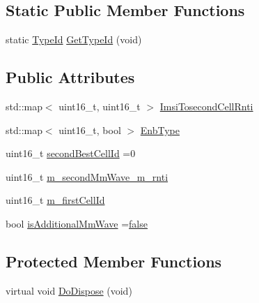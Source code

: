 \subsection*{Static Public Member Functions}
\begin{DoxyCompactItemize}
\item 
static \hyperlink{classns3_1_1TypeId}{Type\+Id} \hyperlink{classns3_1_1LteEnbRrc_a190eb3b4dd8f551a205878eceddac013}{Get\+Type\+Id} (void)
\end{DoxyCompactItemize}
\subsection*{Public Attributes}
\begin{DoxyCompactItemize}
\item 
std\+::map$<$ uint16\+\_\+t, uint16\+\_\+t $>$ \hyperlink{classns3_1_1LteEnbRrc_a5075e20e106c127186f3a7f7d7e5cc9b}{Imsi\+Tosecond\+Cell\+Rnti}
\item 
std\+::map$<$ uint16\+\_\+t, bool $>$ \hyperlink{classns3_1_1LteEnbRrc_acaae2a0038e440cc53930beb11753cd9}{Enb\+Type}
\item 
uint16\+\_\+t \hyperlink{classns3_1_1LteEnbRrc_ad1ecf3d722f64bf11fbc6c4ff1903069}{second\+Best\+Cell\+Id} =0
\item 
uint16\+\_\+t \hyperlink{classns3_1_1LteEnbRrc_a0d8e7fd1653391832108b011b97aebe2}{m\+\_\+second\+Mm\+Wave\+\_\+m\+\_\+rnti}
\item 
uint16\+\_\+t \hyperlink{classns3_1_1LteEnbRrc_aaae3cb8122cd85e953cfe8aeb5b98eb6}{m\+\_\+first\+Cell\+Id}
\item 
bool \hyperlink{classns3_1_1LteEnbRrc_adea9720ee63acdd6ae2fbc660be809d1}{is\+Additional\+Mm\+Wave} =\hyperlink{lte__cqi__generation_8m_ab1bef239d413c4da139c4bac92cd657a}{false}
\end{DoxyCompactItemize}
\subsection*{Protected Member Functions}
\begin{DoxyCompactItemize}
\item 
virtual void \hyperlink{classns3_1_1LteEnbRrc_a6988f943aec1c62cd9e3863b5cd050e0}{Do\+Dispose} (void)
\end{DoxyCompactItemize}
